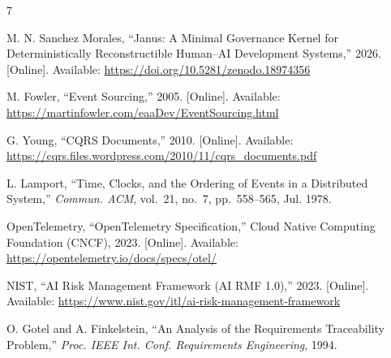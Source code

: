 \documentclass[conference]{IEEEtran}
\begin{document}
\begin{thebibliography}{7}

M. N. Sanchez Morales, ``Janus: A Minimal Governance Kernel for Deterministically Reconstructible Human--AI Development Systems,'' 2026. [Online]. Available: \url{https://doi.org/10.5281/zenodo.18974356}


M. Fowler, ``Event Sourcing,'' 2005. [Online].
Available: \url{https://martinfowler.com/eaaDev/EventSourcing.html}


G. Young, ``CQRS Documents,'' 2010. [Online].
Available: \url{https://cqrs.files.wordpress.com/2010/11/cqrs_documents.pdf}


L. Lamport, ``Time, Clocks, and the Ordering of Events in a Distributed System,''
\emph{Commun. ACM}, vol.~21, no.~7, pp.~558--565, Jul. 1978.


OpenTelemetry, ``OpenTelemetry Specification,''
Cloud Native Computing Foundation (CNCF), 2023. [Online].
Available: \url{https://opentelemetry.io/docs/specs/otel/}


NIST, ``AI Risk Management Framework (AI RMF 1.0),'' 2023. [Online].
Available: \url{https://www.nist.gov/itl/ai-risk-management-framework}


O. Gotel and A. Finkelstein, ``An Analysis of the Requirements Traceability
Problem,'' \emph{Proc. IEEE Int. Conf. Requirements Engineering}, 1994.

\end{thebibliography}
\end{document}
